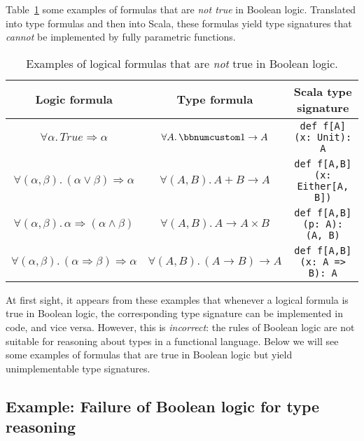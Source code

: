Table~\ref{tab:Logical-formulas-not-Boolean-theorems} some examples
of formulas that are \emph{not true} in Boolean logic. Translated
into type formulas and then into Scala, these formulas yield type
signatures that \emph{cannot} be implemented by fully parametric functions.

\begin{table}
\begin{centering}
\begin{tabular}{|c|c|c|}
\hline 
\textbf{\small{}Logic formula} & \textbf{\small{}Type formula} & \textbf{\small{}Scala type signature}\tabularnewline
\hline 
\hline 
{\footnotesize{}$\forall\alpha.\,True\Rightarrow\alpha$} & {\footnotesize{}$\forall A.\,\bbnum 1\rightarrow A$} & \lstinline!def f[A](x: Unit): A!\tabularnewline
\hline 
{\footnotesize{}$\forall(\alpha,\beta).\,(\alpha\vee\beta)\Rightarrow\alpha$} & {\footnotesize{}$\forall(A,B).\,A+B\rightarrow A$} & \lstinline!def f[A,B](x: Either[A, B])!\tabularnewline
\hline 
{\footnotesize{}$\forall(\alpha,\beta).\,\alpha\Rightarrow(\alpha\wedge\beta)$} & {\footnotesize{}$\forall(A,B).\,A\rightarrow A\times B$} & \lstinline!def f[A,B](p: A): (A, B)!\tabularnewline
\hline 
{\footnotesize{}$\forall(\alpha,\beta).\,(\alpha\Rightarrow\beta)\Rightarrow\alpha$} & {\footnotesize{}$\forall(A,B).\,(A\rightarrow B)\rightarrow A$} & \lstinline!def f[A,B](x: A => B): A!\tabularnewline
\hline 
\end{tabular}
\par\end{centering}
\caption{Examples of logical formulas that are \emph{not} true in Boolean logic.\label{tab:Logical-formulas-not-Boolean-theorems}}
\end{table}

At first sight, it appears from these examples that whenever a logical
formula is true in Boolean logic, the corresponding type signature
can be implemented in code, and vice versa. However, this is \emph{incorrect}:
the rules of Boolean logic are not suitable for reasoning about types
in a functional language. Below we will see some examples of formulas
that are true in Boolean logic but yield unimplementable type signatures.

\subsection{Example: Failure of Boolean logic for type reasoning\label{subsec:Example:-Failure-of-Boolean-logic}}

